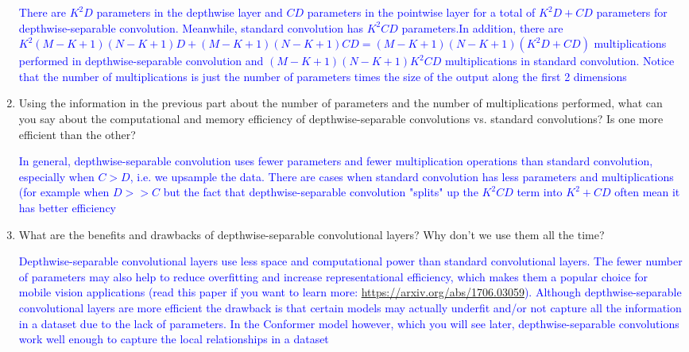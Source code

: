 \documentclass{article}
\begin{document}
\begin{enumerate}[label=(\alph*)]
    \textcolor{blue}{There are $K^2D$ parameters in the depthwise layer and $CD$ parameters in the pointwise layer for a total of $K^2D + CD$ parameters for depthwise-separable convolution. Meanwhile, standard convolution has $K^2CD$ parameters.In addition, there are $K^2(M-K+1)(N-K+1)D + (M-K+1)(N-K+1)CD = (M-K+1)(N-K+1)(K^2D+CD)$ multiplications performed in depthwise-separable convolution and $(M-K+1)(N-K+1)K^2CD$ multiplications in standard convolution. Notice that the number of multiplications is just the number of parameters times the size of the output along the first 2 dimensions}

    \item Using the information in the previous part about the number of parameters and the number of multiplications performed, what can you say about the computational and memory efficiency of depthwise-separable convolutions vs. standard convolutions? Is one more efficient than the other? 

    \textcolor{blue}{In general, depthwise-separable convolution uses fewer parameters and fewer multiplication operations than standard convolution, especially when $C > D$, i.e. we upsample the data. There are cases when standard convolution has less parameters and multiplications (for example when $D >> C$ but the fact that depthwise-separable convolution "splits" up the $K^2CD$ term into $K^2 + CD$ often mean it has better efficiency}

    \item What are the benefits and drawbacks of depthwise-separable convolutional layers? Why don't we use them all the time?

    \textcolor{blue}{Depthwise-separable convolutional layers use less space and computational power than standard convolutional layers. The fewer number of parameters may also help to reduce overfitting and increase representational efficiency, which makes them a popular choice for mobile vision applications (read this paper if you want to learn more: \url{https://arxiv.org/abs/1706.03059}). Although depthwise-separable convolutional layers are more efficient the drawback is that certain models may actually underfit and/or not capture all the information in a dataset due to the lack of parameters. In the Conformer model however, which you will see later, depthwise-separable convolutions work well enough to capture the local relationships in a dataset}
\end{enumerate}
\thispagestyle{plain}

\newpage
\thispagestyle{plain}
\end{document}
